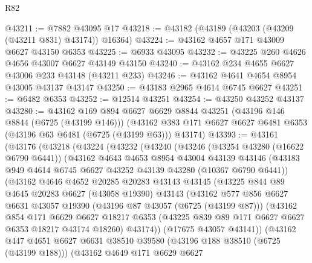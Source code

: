 \begin{lexlean}{R82}
\begin{coremodule}
@43211 := @7882 @43095 @17
@43218 := @43182 (@43189 (@43203 (@43209 (@43211 @831) @43174)) @16364)
@43224 := @43162 @4657 @171 @43009 @6627 @43150 @6353
@43225 := @6933 @43095
@43232 := @43225 @260 @4626 @4656 @43007 @6627 @43149 @43150
@43240 := @43162 @234 @4655 @6627 @43006 @233 @43148 (@43211 @233)
@43246 := @43162 @4641 @4654 @8954 @43005 @43137 @43147
@43250 := @43183 @2965 @4614 @6745 @6627
@43251 := @6482 @6353
@43252 := @12514 @43251
@43254 := @43250 @43252 @43137
@43280 := @43162
    @169
    @894
    @6627
    @6629
    @8844
    @43251
    (@43196 @146 @8844 (@6725 (@43199 @146)))
    (@43162 @383 @171 @6627 @6627 @6481 @6353 (@43196 @63 @6481 (@6725 (@43199 @63))) @43174)
@43393 := @43161
    (@43176
      (@43218
        (@43224
          (@43232
            (@43240
              (@43246
                (@43254 @43280 (@16622 @6790 @6441))
                (@43162
                  @4643
                  @4653
                  @8954
                  @43004
                  @43139
                  @43146
                  (@43183 @949 @4614 @6745 @6627 @43252 @43139 @43280 (@10367 @6790 @6441))
                  (@43162
                    @4646
                    @4652
                    @20285
                    @20283
                    @43143
                    @43145
                    (@43225
                      @844
                      @89
                      @4645
                      @20283
                      @6627
                      (@43058 @19390)
                      @43143
                      (@43162
                        @577
                        @856
                        @6627
                        @6631
                        @43057
                        @19390
                        (@43196 @87 @43057 (@6725 (@43199 @87)))
                        (@43162
                          @854
                          @171
                          @6629
                          @6627
                          @18217
                          @6353
                          (@43225 @839 @89 @171 @6627 @6627 @6353 @18217 @43174 @18260)
                          @43174))
                      (@17675 @43057 @43141))
                    (@43162
                      @447
                      @4651
                      @6627
                      @6631
                      @38510
                      @39580
                      (@43196 @188 @38510 (@6725 (@43199 @188)))
                      (@43162
                        @4649
                        @171
                        @6629
                        @6627

\end{coremodule}
\end{lexlean}
